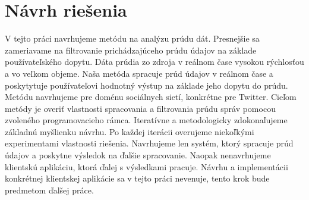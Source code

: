 \linespread{1.5}

\chapter{Návrh riešenia}
V tejto práci navrhujeme metódu na analýzu prúdu dát. Presnejšie sa zameriavame na filtrovanie prichádzajúceho prúdu údajov na základe používateľského dopytu. Dáta prúdia zo zdroja v reálnom čase vysokou rýchlosťou a vo veľkom objeme. 
Naša metóda spracuje prúd údajov v reálnom čase a poskytytuje používateľovi hodnotný výstup na základe jeho dopytu do prúdu. Metódu navrhujeme pre doménu sociálnych sietí, konkrétne pre Twitter. Cieľom metódy je overiť vlastnosti spracovania a filtrovania prúdu správ pomocou zvoleného programovacieho rámca. Iteratívne a metodologicky zdokonaľujeme základnú myšlienku návrhu. Po každej iterácii overujeme niekoľkými experimentami vlastnosti riešenia. Navrhujeme len systém, ktorý spracuje prúd údajov a poskytne výsledok na ďalšie spracovanie. Naopak nenavrhujeme klientskú aplikáciu, ktorá ďalej s výsledkami pracuje. Návrhu a implementácii konkrétnej klientskej aplikácie sa v tejto práci nevenuje, tento krok bude predmetom ďalšej práce. 

